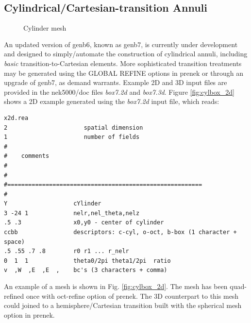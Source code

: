 \subsection{Cylindrical/Cartesian-transition Annuli}
\begin{figure}
\centering
{}
\quad\quad\quad
{} 
\caption{Cylinder mesh}
\end{figure}


An updated version of genb6, known as genb7, is currently under development
and designed to simply/automate the construction of cylindrical annuli, 
including {\em basic} transition-to-Cartesian elements.   More sophisticated
transition treatments may be generated using the GLOBAL REFINE options in
prenek or through an upgrade of genb7, as demand warrants.
Example 2D and 3D input files are provided in the nek5000/doc files
{\em box7.2d} and {\em box7.3d}.
Figure \ref{fig:cylbox_2d} shows a 2D example generated using 
the {\em box7.2d} input file, which reads:
\begin{verbatim}
x2d.rea
2                      spatial dimension
1                      number of fields
#
#    comments
#
#
#========================================================
#
Y                   cYlinder
3 -24 1             nelr,nel_theta,nelz
.5 .3               x0,y0 - center of cylinder
ccbb                descriptors: c-cyl, o-oct, b-box (1 character + space)
.5 .55 .7 .8        r0 r1 ... r_nelr
0  1  1             theta0/2pi theta1/2pi  ratio 
v  ,W  ,E  ,E  ,    bc's (3 characters + comma)
\end{verbatim}

\noindent
An example of a mesh is shown in Fig. \ref{fig:cylbox_2d}.   The mesh has been quad-refined
once with oct-refine option of prenek. The 3D counterpart to this 
mesh could joined to a hemisphere/Cartesian transition built with
the spherical mesh option in prenek. 
